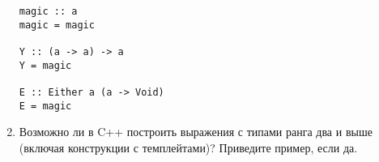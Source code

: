 \begin{enumerate}
          \begin{verbatim}
magic :: a
magic = magic

Y :: (a -> a) -> a
Y = magic

E :: Either a (a -> Void)
E = magic
          \end{verbatim}
    \item Возможно ли в C++ построить выражения с типами ранга два и выше (включая конструкции с темплейтами)?
          Приведите пример, если да.
\end{enumerate}



